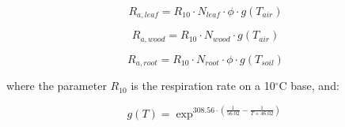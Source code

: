 \begin{equation}
	R_{a,leaf} = R_{10} \cdot N_{leaf} \cdot \phi \cdot g(T_{air})
\end{equation}

\begin{equation}
	R_{a,wood} = R_{10} \cdot N_{wood} \cdot g(T_{air})
\end{equation}

\begin{equation}
	R_{a,root} = R_{10} \cdot N_{root} \cdot \phi \cdot g(T_{soil})
\end{equation}

where the parameter $R_{10}$ is the respiration rate on a 10$^\circ$C base, and:

\begin{equation}
	g(T) = \exp^{308.56 \cdot (\frac{1}{56.02} - \frac{1}{T + 46.02})}
\end{equation}
